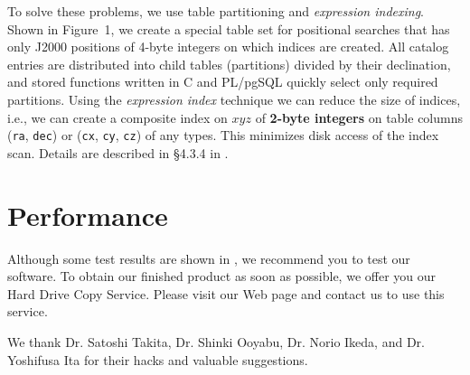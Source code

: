 To solve these problems, we use table partitioning and {\it expression indexing}. Shown in Figure~1, we create a special table set for positional searches that has only J2000 positions of 4-byte integers on which indices are created. All catalog entries are distributed into child tables (partitions) divided by their declination, and stored functions written in C and PL/pgSQL quickly select only required partitions. Using the {\it expression index} technique we can reduce the size of indices, i.e., we can create a composite index on $x$$y$$z$ of {\bf 2-byte integers} on table columns ({\tt ra}, {\tt dec}) or ({\tt cx}, {\tt cy}, {\tt cz}) of any types. This minimizes disk access of the index scan. Details are described in \S 4.3.4 in \citet{yam_2011a}.


\section{Performance}

Although some test results are shown in \citet{yam_2011a}, we recommend you to test our software. To obtain our finished product as soon as possible, we offer you our Hard Drive Copy Service. Please visit our Web page and contact us to use this service. 

\acknowledgements We thank 
Dr. Satoshi Takita, Dr. Shinki Ooyabu, Dr. Norio Ikeda, and Dr. Yoshifusa Ita for their hacks and valuable suggestions.


